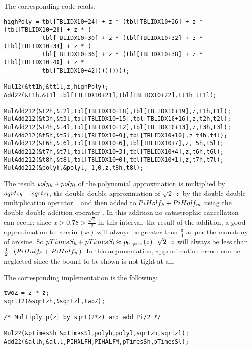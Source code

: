 The corresponding code reads:
\begin{lstlisting}[caption={High path quick phase polynomial approximation},firstnumber=1]
highPoly = tbl[TBLIDX10+24] + z * (tbl[TBLIDX10+26] + z * (tbl[TBLIDX10+28] + z * (
           tbl[TBLIDX10+30] + z * (tbl[TBLIDX10+32] + z * (tbl[TBLIDX10+34] + z * (
           tbl[TBLIDX10+36] + z * (tbl[TBLIDX10+38] + z * (tbl[TBLIDX10+40] + z * 
           tbl[TBLIDX10+42]))))))));

Mul12(&tt1h,&tt1l,z,highPoly);
Add22(&t1h,&t1l,tbl[TBLIDX10+21],tbl[TBLIDX10+22],tt1h,tt1l);

MulAdd212(&t2h,&t2l,tbl[TBLIDX10+18],tbl[TBLIDX10+19],z,t1h,t1l);
MulAdd212(&t3h,&t3l,tbl[TBLIDX10+15],tbl[TBLIDX10+16],z,t2h,t2l);
MulAdd212(&t4h,&t4l,tbl[TBLIDX10+12],tbl[TBLIDX10+13],z,t3h,t3l);
MulAdd212(&t5h,&t5l,tbl[TBLIDX10+9],tbl[TBLIDX10+10],z,t4h,t4l);
MulAdd212(&t6h,&t6l,tbl[TBLIDX10+6],tbl[TBLIDX10+7],z,t5h,t5l);
MulAdd212(&t7h,&t7l,tbl[TBLIDX10+3],tbl[TBLIDX10+4],z,t6h,t6l);
MulAdd212(&t8h,&t8l,tbl[TBLIDX10+0],tbl[TBLIDX10+1],z,t7h,t7l);
MulAdd212(&polyh,&polyl,-1,0,z,t8h,t8l);
\end{lstlisting} 

The result $poly_{\mathit{h}} + poly_{\mathit{l}}$ of the polynomial approximation is
multiplied by $sqrtz_{\mathit{h}} + sqrtz_{\mathit{l}}$, the double-double approximation
of $\sqrt{2 \cdot z}$ by the double-double multiplication
operator \MulDD~ and then added to $PiHalf_{\mathit{h}} + PiHalf_{\mathit{m}}$ using the
double-double addition operator \AddDD. In this addition no
catastrophic cancellation can occur: since $x > 0.78 >
\frac{\sqrt{2}}{2}$ in this interval, the result of the addition, a
good approximation to $\arcsin\left( x \right)$ will always be greater
than $\frac{\pi}{4}$ as per the monotony of arcsine.  So $pTimesS_{\mathit{h}}
+ pTimesS_{\mathit{l}} \approx p_{9\mbox{\tiny ~quick}}\left( z \right) \cdot
\sqrt{2 \cdot z}$ will always be less than $\frac{1}{2} \cdot \left(
  PiHalf_{\mathit{h}} + PiHalf_{\mathit{m}} \right)$. In this argumentation,
approximation errors can be neglected since the bound to be shown is
not tight at all.

The corresponding implementation is the following:
\begin{lstlisting}[caption={High path: square root extraction and reconstruction},firstnumber=1]
twoZ = 2 * z;
sqrt12(&sqrtzh,&sqrtzl,twoZ);                                                         

/* Multiply p(z) by sqrt(2*z) and add Pi/2 */

Mul22(&pTimesSh,&pTimesSl,polyh,polyl,sqrtzh,sqrtzl);                    
Add22(&allh,&alll,PIHALFH,PIHALFM,pTimesSh,pTimesSl);       
\end{lstlisting} 

